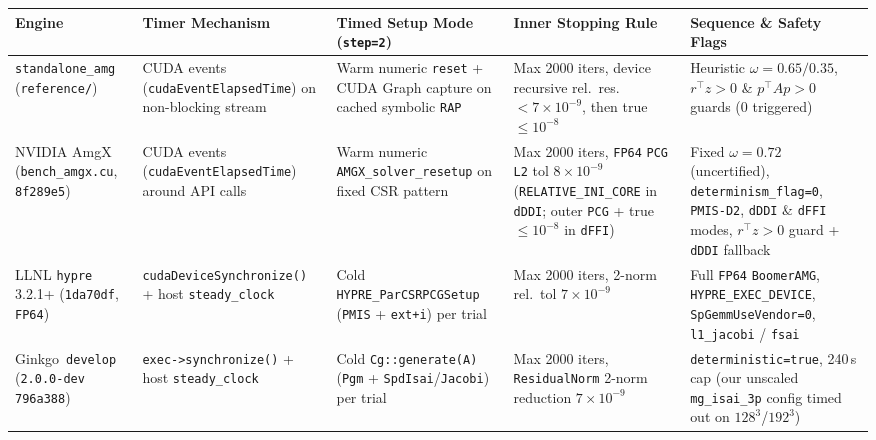 \documentclass[10pt]{article}
\begin{document}
\begin{table}[t]
\centering\scriptsize
\begin{tabular}{@{}p{}p{}p{}p{}p{}@{}}
\toprule
Engine & Timer Mechanism & Timed Setup Mode (\texttt{step=2}) & Inner Stopping Rule & Sequence \& Safety Flags \\
\midrule
\texttt{standalone\_amg} (\texttt{reference/}) & CUDA events (\texttt{cudaEventElapsedTime}) on non-blocking stream & Warm numeric \texttt{reset} + CUDA Graph capture on cached symbolic \texttt{RAP} & Max 2000 iters, device recursive rel.\ res.\ $< 7\times 10^{-9}$, then true $\le 10^{-8}$ & Heuristic $\omega = 0.65/0.35$, $r^\top z > 0$ \& $p^\top A p > 0$ guards (0 triggered) \\
NVIDIA AmgX (\texttt{bench\_amgx.cu}, \texttt{8f289e5}) & CUDA events (\texttt{cudaEventElapsedTime}) around API calls & Warm numeric \texttt{AMGX\_solver\_resetup} on fixed CSR pattern & Max 2000 iters, \texttt{FP64} \texttt{PCG} \texttt{L2} tol $8\times 10^{-9}$ (\texttt{RELATIVE\_INI\_CORE} in \texttt{dDDI}; outer \texttt{PCG} + true $\le 10^{-8}$ in \texttt{dFFI}) & Fixed $\omega = 0.72$ (uncertified), \texttt{determinism\_flag=0}, \texttt{PMIS-D2}, \texttt{dDDI} \& \texttt{dFFI} modes, $r^\top z > 0$ guard + \texttt{dDDI} fallback \\
LLNL \texttt{hypre} 3.2.1+ (\texttt{1da70df}, \texttt{FP64}) & \texttt{cudaDeviceSynchronize()} + host \texttt{steady\_clock} & Cold \texttt{HYPRE\_ParCSRPCGSetup} (\texttt{PMIS} + \texttt{ext+i}) per trial & Max 2000 iters, 2-norm rel.\ tol $7\times 10^{-9}$ & Full \texttt{FP64} \texttt{BoomerAMG}, \texttt{HYPRE\_EXEC\_DEVICE}, \texttt{SpGemmUseVendor=0}, \texttt{l1\_jacobi} / \texttt{fsai} \\
Ginkgo~\texttt{develop} (\texttt{2.0.0-dev} \texttt{796a388}) & \texttt{exec->synchronize()} + host \texttt{steady\_clock} & Cold \texttt{Cg::generate(A)} (\texttt{Pgm} + \texttt{SpdIsai}/\texttt{Jacobi}) per trial & Max 2000 iters, \texttt{ResidualNorm} 2-norm reduction $7\times 10^{-9}$ & \texttt{deterministic=true}, 240\,s cap (our unscaled \texttt{mg\_isai\_3p} config timed out on $128^3$/$192^3$) \\
\bottomrule
\end{tabular}

\end{table}
\end{document}

